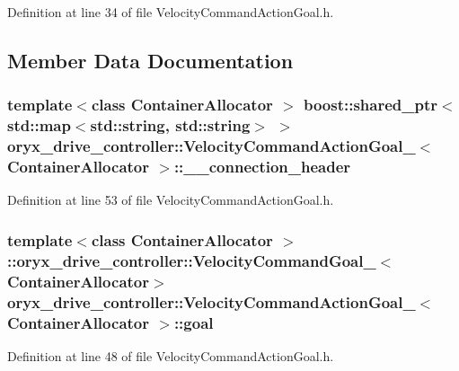 \-Definition at line 34 of file \-Velocity\-Command\-Action\-Goal.\-h.



\subsection{\-Member \-Data \-Documentation}
\subsubsection[{\-\_\-\-\_\-connection\-\_\-header}]{\setlength{\rightskip}{0pt plus 5cm}template$<$class Container\-Allocator $>$ boost\-::shared\-\_\-ptr$<$std\-::map$<$std\-::string, std\-::string$>$ $>$ {\bf oryx\-\_\-drive\-\_\-controller\-::\-Velocity\-Command\-Action\-Goal\-\_\-}$<$ \-Container\-Allocator $>$\-::{\bf \-\_\-\-\_\-connection\-\_\-header}}\label{structoryx__drive__controller_1_1VelocityCommandActionGoal___a01e7ff5553777db965201f946f04e4d5}


\-Definition at line 53 of file \-Velocity\-Command\-Action\-Goal.\-h.

\subsubsection[{goal}]{\setlength{\rightskip}{0pt plus 5cm}template$<$class Container\-Allocator $>$ \-::{\bf oryx\-\_\-drive\-\_\-controller\-::\-Velocity\-Command\-Goal\-\_\-}$<$\-Container\-Allocator$>$ {\bf oryx\-\_\-drive\-\_\-controller\-::\-Velocity\-Command\-Action\-Goal\-\_\-}$<$ \-Container\-Allocator $>$\-::{\bf goal}}\label{structoryx__drive__controller_1_1VelocityCommandActionGoal___ad8473b0cd18d0bf9949b94e7b15d741e}


\-Definition at line 48 of file \-Velocity\-Command\-Action\-Goal.\-h.

